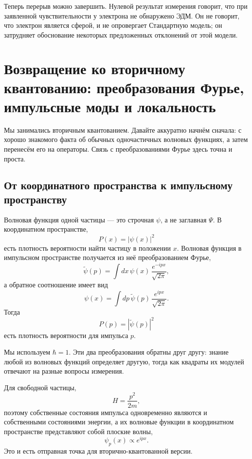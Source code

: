 Теперь перерыв можно завершить. Нулевой результат измерения говорит, что при заявленной чувствительности у электрона не обнаружено ЭДМ. Он не говорит, что электрон является сферой, и не опровергает Стандартную модель; он затрудняет обоснование некоторых предложенных отклонений от этой модели.

\section{Возвращение ко вторичному квантованию: преобразования Фурье, импульсные моды и локальность}

Мы занимались вторичным квантованием. Давайте аккуратно начнём сначала: с хорошо знакомого факта об обычных одночастичных волновых функциях, а затем перенесём его на операторы. Связь с преобразованиями Фурье здесь точна и проста.

\subsection{От координатного пространства к импульсному пространству}

Волновая функция одной частицы — это строчная \(\psi\), а не заглавная \(\Psi\). В координатном пространстве,
\begin{equation}
P(x)=|\psi(x)|^2
\end{equation}
есть плотность вероятности найти частицу в положении \(x\). Волновая функция в импульсном пространстве получается из неё преобразованием Фурье,
\begin{equation}
\tilde{\psi}(p)=\int dx\,\psi(x)\,\frac{e^{-ipx}}{\sqrt{2\pi}},
\end{equation}
а обратное соотношение имеет вид
\begin{equation}
\psi(x)=\int dp\,\tilde{\psi}(p)\,\frac{e^{ipx}}{\sqrt{2\pi}}.
\end{equation}
Тогда
\begin{equation}
P(p)=|\tilde{\psi}(p)|^2
\end{equation}
есть плотность вероятности для импульса \(p\).

Мы используем \(\hbar=1\). Эти два преобразования обратны друг другу: знание любой из волновых функций определяет другую, тогда как квадраты их модулей отвечают на разные вопросы измерения.

Для свободной частицы,
\begin{equation}
H=\frac{p^2}{2m},
\end{equation}
поэтому собственные состояния импульса одновременно являются и собственными состояниями энергии, а их волновые функции в координатном пространстве представляют собой плоские волны,
\begin{equation}
\psi_p(x)\propto e^{ipx}.
\end{equation}
Это и есть отправная точка для вторично-квантованной версии.

